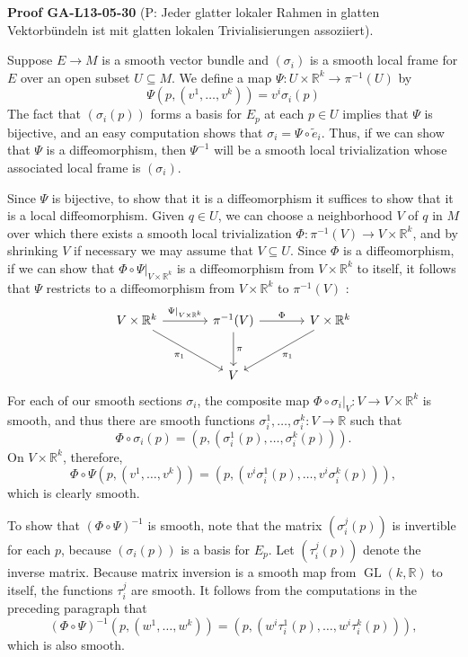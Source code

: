 \documentclass[10pt, letterpaper]{article}
\newcommand{\CustomHeading}[3]{%
  \par\medskip\noindent%
  \textbf{#1 #2} \textnormal{(#3)}.\enskip%
}
\newenvironment{PROOF}[2]{\begin{unitbox}\CustomHeading{Proof}{#1}{#2}}{\end{unitbox}}
\begin{document}
\begin{PROOF}{GA-L13-05-30}{P: Jeder glatter lokaler Rahmen in glatten Vektorbündeln ist mit glatten lokalen Trivialisierungen assoziiert}
Suppose $E \rightarrow M$ is a smooth vector bundle and $\left(\sigma_{i}\right)$ is a smooth local frame for $E$ over an open subset $U \subseteq M$. We define a map $\Psi: U \times \mathbb{R}^{k} \rightarrow \pi^{-1}(U)$ by
$$
\Psi\left(p,\left(v^{1}, \ldots, v^{k}\right)\right)=v^{i} \sigma_{i}(p)
$$
The fact that $\left(\sigma_{i}(p)\right)$ forms a basis for $E_{p}$ at each $p \in U$ implies that $\Psi$ is bijective, and an easy computation shows that $\sigma_{i}=\Psi \circ \tilde{e}_{i}$. Thus, if we can show that $\Psi$ is a diffeomorphism, then $\Psi^{-1}$ will be a smooth local trivialization whose associated local frame is $\left(\sigma_{i}\right)$.

Since $\Psi$ is bijective, to show that it is a diffeomorphism it suffices to show that it is a local diffeomorphism. Given $q \in U$, we can choose a neighborhood $V$ of $q$ in $M$ over which there exists a smooth local trivialization $\Phi: \pi^{-1}(V) \rightarrow V \times \mathbb{R}^{k}$, and by shrinking $V$ if necessary we may assume that $V \subseteq U$. Since $\Phi$ is a diffeomorphism, if we can show that $\left.\Phi \circ \Psi\right|_{V \times \mathbb{R}^{k}}$ is a diffeomorphism from $V \times \mathbb{R}^{k}$ to itself, it follows that $\Psi$ restricts to a diffeomorphism from $V \times \mathbb{R}^{k}$ to $\pi^{-1}(V)$ :
\[
\begin{tikzcd}[column sep=large, row sep=large]
V \times \mathbb{R}^k \arrow[r, "\Psi|_{V \times \mathbb{R}^k}"] \arrow[dr, swap, "\pi_1"] 
  & \pi^{-1}(V) \arrow[r, "\Phi"] \arrow[d, "\pi"] 
  & V \times \mathbb{R}^k \arrow[dl, "\pi_1"] \\
& V
\end{tikzcd}
\]
For each of our smooth sections $\sigma_{i}$, the composite map $\left.\Phi \circ \sigma_{i}\right|_{V}: V \rightarrow V \times \mathbb{R}^{k}$ is smooth, and thus there are smooth functions $\sigma_{i}^{1}, \ldots, \sigma_{i}^{k}: V \rightarrow \mathbb{R}$ such that
$$
\Phi \circ \sigma_{i}(p)=\left(p,\left(\sigma_{i}^{1}(p), \ldots, \sigma_{i}^{k}(p)\right)\right) .
$$
On $V \times \mathbb{R}^{k}$, therefore,
$$
\Phi \circ \Psi\left(p,\left(v^{1}, \ldots, v^{k}\right)\right)=\left(p,\left(v^{i} \sigma_{i}^{1}(p), \ldots, v^{i} \sigma_{i}^{k}(p)\right)\right),
$$
which is clearly smooth.

To show that $(\Phi \circ \Psi)^{-1}$ is smooth, note that the matrix $\left(\sigma_{i}^{j}(p)\right)$ is invertible for each $p$, because $\left(\sigma_{i}(p)\right)$ is a basis for $E_{p}$. Let $\left(\tau_{i}^{j}(p)\right)$ denote the inverse matrix. Because matrix inversion is a smooth map from $\operatorname{GL}(k, \mathbb{R})$ to itself, the functions $\tau_{i}^{j}$ are smooth. It follows from the computations in the preceding paragraph that
$$
(\Phi \circ \Psi)^{-1}\left(p,\left(w^{1}, \ldots, w^{k}\right)\right)=\left(p,\left(w^{i} \tau_{i}^{1}(p), \ldots, w^{i} \tau_{i}^{k}(p)\right)\right),
$$
which is also smooth.
\end{PROOF}
\end{document}

